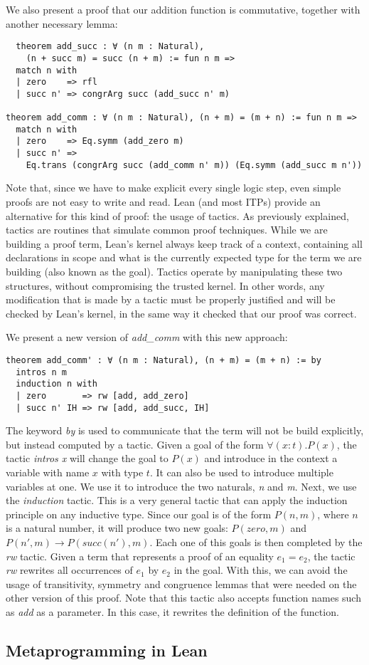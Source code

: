 We also present a proof that our addition function is commutative, together with another necessary lemma:

\begin{verbatim}
  theorem add_succ : ∀ (n m : Natural),
    (n + succ m) = succ (n + m) := fun n m =>
  match n with
  | zero    => rfl
  | succ n' => congrArg succ (add_succ n' m)

theorem add_comm : ∀ (n m : Natural), (n + m) = (m + n) := fun n m =>
  match n with
  | zero    => Eq.symm (add_zero m)
  | succ n' =>
    Eq.trans (congrArg succ (add_comm n' m)) (Eq.symm (add_succ m n'))
\end{verbatim}

Note that, since we have to make explicit every single logic step, even simple proofs are not easy to write and read. Lean (and most ITPs) provide an alternative for this kind of proof: the usage of tactics. As previously explained, tactics are routines that simulate common proof techniques. While we are building a proof term, Lean's kernel always keep track of a context, containing all declarations in scope and what is the currently expected type for the term we are building (also known as the goal). Tactics operate by manipulating these two structures, without compromising the trusted kernel. In other words, any modification that is made by a tactic must be properly justified and will be checked by Lean's kernel, in the same way it checked that our proof was correct.

We present a new version of \textit{add\_comm} with this new approach:

\begin{verbatim}
theorem add_comm' : ∀ (n m : Natural), (n + m) = (m + n) := by
  intros n m
  induction n with
  | zero       => rw [add, add_zero]
  | succ n' IH => rw [add, add_succ, IH]
\end{verbatim}

The keyword \textit{by} is used to communicate that the term will not be build explicitly, but instead computed by a tactic. Given a goal of the form $\forall (x : t) . P(x)$, the tactic \textit{intros x} will change the goal to $P(x)$ and introduce in the context a variable with name $x$ with type $t$. It can also be used to introduce multiple variables at one. We use it to introduce the two naturals, \textit{n} and \textit{m}. Next, we use the \textit{induction} tactic. This is a very general tactic that can apply the induction principle on any inductive type. Since our goal is of the form $P(n, m)$, where $n$ is a natural number, it will produce two new goals: $P(zero, m)$ and $P(n', m) \rightarrow P(succ(n'), m)$. Each one of this goals is then completed by the \textit{rw} tactic. Given a term that represents a proof of an equality $e_{1} = e_{2}$, the tactic \textit{rw} rewrites all occurrences of $e_{1}$ by $e_{2}$ in the goal. With this, we can avoid the usage of transitivity, symmetry and congruence lemmas that were needed on the other version of this proof. Note that this tactic also accepts function names such as \textit{add} as a parameter. In this case, it rewrites the definition of the function.

\subsection{Metaprogramming in Lean}
